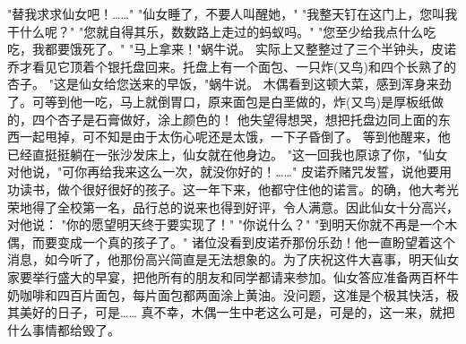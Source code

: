 \documentclass[12pt,UTF8]{ctexbook}
\begin{document}
"替我求求仙女吧！……"
"仙女睡了，不要人叫醒她，"
"我整天钉在这门上，您叫我干什么呢？"
"您就自得其乐，数数路上走过的蚂蚁吗。"
"您至少给我点什么吃吃，我都要饿死了。"
"马上拿来！"蜗牛说。
实际上又整整过了三个半钟头，皮诺乔才看见它顶着个银托盘回来。托盘上有一个面包、一只炸(又鸟)和四个长熟了的杏子。
"这是仙女给您送来的早饭，"蜗牛说。
木偶看到这顿大菜，感到浑身来劲了。可等到他一吃，马上就倒胃口，原来面包是白垩做的，炸(又鸟)是厚板纸做的，四个杏子是石膏做好，涂上颜色的！
他失望得想哭，想把托盘边同上面的东西一起甩掉，可不知是由于太伤心呢还是太饿，一下子昏倒了。
等到他醒来，他已经直挺挺躺在一张沙发床上，仙女就在他身边。
"这一回我也原谅了你，"仙女对他说，"可你再给我来这么一次，就没你好的！……"
皮诺乔赌咒发誓，说他要用功读书，做个很好很好的孩子。这一年下来，他都守住他的诺言。的确，他大考光荣地得了全校第一名，品行总的说来也得到好评，令人满意。因此仙女十分高兴，对他说：
"你的愿望明天终于要实现了！"
"你说什么？"
"到明天你就不再是一个木偶，而要变成一个真的孩子了。"
诸位没看到皮诺乔那份乐劲！他一直盼望着这个消息，如今听了，他那份高兴简直是无法想象的。为了庆祝这件大喜事，明天仙女家要举行盛大的早宴，把他所有的朋友和同学都请来参加。仙女答应准备两百杯牛奶咖啡和四百片面包，每片面包都两面涂上黄油。没问题，这准是个极其快活，极其美好的日子，可是……
真不幸，木偶一生中老这么可是，可是的，这一来，就把什么事情都给毁了。

\chapter{}
\end{document}
